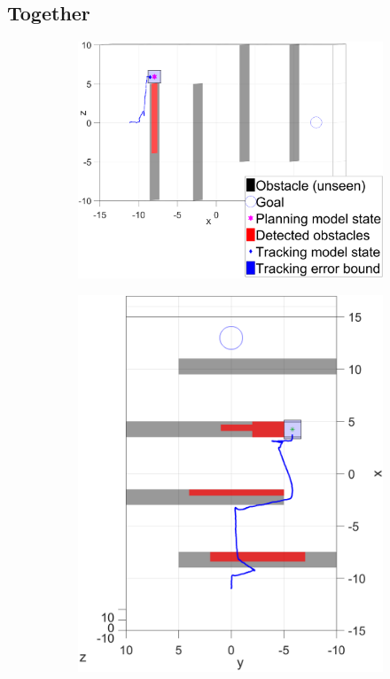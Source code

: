 \subsection{Together}
\begin{figure}
  \centering
  \begin{subfigure}[t]{0.45\textwidth} \label{subfig:sim_1}
    \includegraphics[width=\columnwidth]{fig/224}
    \caption{}
  \end{subfigure}
  \begin{subfigure}[t]{0.35\textwidth} \label{subfig:sim_2}
    \includegraphics[width=\columnwidth]{fig/763}
    \caption{}
  \end{subfigure}
  

\end{figure}
